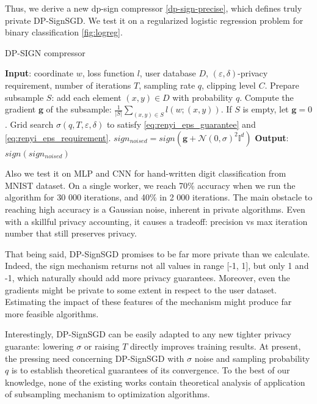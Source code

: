 \documentclass[a4paper, 12pt]{article}
\newcommand{\eps}{\varepsilon}
\begin{document}
Thus, we derive a new dp-sign compressor \ref{dp-sign-precise}, which defines truly private DP-SignSGD. We test it on a regularized logistic regression problem for binary classification \ref{fig:logreg}.


\newcommand{\gradg}{\boldsymbol{g}}
\begin{algorithm}
    \caption{DP-SIGN compressor}
    \label{dp-sign-precise}
    \begin{algorithmic}
        \STATE \textbf{Input}: coordinate $w$, loss function $l$, user database $D$, $(\eps, \delta)$-privacy requirement, number of iterations $T$, sampling rate $q$, clipping level $C$.
        \STATE Prepare subsample $S$: add each element $(x, y) \in D$ with probability $q$.
        \STATE Compute the gradient $\gradg$ of the subsample: $\frac{1}{|S|}\sum_{(x,y)\in S}l(w;(x,y))$. If $S$ is empty, let $\gradg = 0$.
        \STATE Grid search $\sigma(q, T, \eps, \delta)$ to satisfy \eqref{eq:renyi_eps_guarantee} and \eqref{eq:renyi_eps_requirement}.
        \STATE $sign_{noised} = sign(\gradg + \mathcal{N}(0,\sigma)^2\mathbb{I}^d)$
        \STATE \textbf{Output}: $sign(sign_{noised})$
    \end{algorithmic}
\end{algorithm}

Also we test it on MLP and CNN for hand-written digit classification from MNIST dataset. On a single worker, we reach 70\% accuracy when we run the algorithm for 30 000 iterations, and 40\% in 2 000 iterations. The main obstacle to reaching high accuracy is a Gaussian noise, inherent in private algorithms. Even with a skillful privacy accounting, it causes a tradeoff: precision vs max iteration number that still preserves privacy.

That being said, DP-SignSGD promises to be far more private than we calculate. Indeed, the sign mechanism returns not all values in range [-1, 1], but only 1 and -1, which naturally should add more privacy guarantees. Moreover, even the gradients might be private to some extent in respect to the user dataset. Estimating the impact of these features of the mechanism might produce far more feasible algorithms.

Interestingly, DP-SignSGD can be easily adapted to any new tighter privacy guarante: lowering $\sigma$ or raising $T$ directly improves training results. At present, the pressing need concerning DP-SignSGD with $\sigma$ noise and sampling probability $q$ is to establish theoretical guarantees of its convergence. To the best of our knowledge, none of the existing works contain theoretical analysis of application of subsampling mechanism to optimization algorithms.

\vspace{-2em}
\printbibliography[heading=bibliography]
\end{document}
